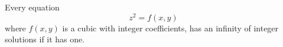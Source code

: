 \begin{conjecture}
    Every equation
\[
    z^2=f(x,y)
\]
    where $f(x,y)$ is a cubic with integer coefficients, has an infinity of integer solutions if it has one.
\end{conjecture}
